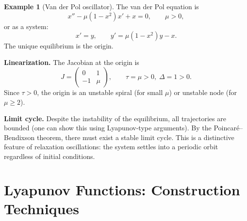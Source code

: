 \documentclass[12pt,a4paper,openany]{book}
\theoremstyle{definition}
\newtheorem{example}[definition]{Example}
\theoremstyle{plain}
\theoremstyle{remark}
\begin{document}
\begin{example}[Van der Pol oscillator]
\label{ex:van-der-pol}
The van der Pol equation is
\begin{equation}\label{eq:van-der-pol}
  x'' - \mu(1-x^2)x' + x = 0, \qquad \mu>0,
\end{equation}
or as a system:
\[
  x' = y, \qquad y' = \mu(1-x^2)y - x.
\]
The unique equilibrium is the origin.

\medskip\noindent\textbf{Linearization.}
The Jacobian at the origin is
\[
  J = \begin{pmatrix} 0 & 1 \\ -1 & \mu \end{pmatrix},
  \qquad \tau=\mu>0,\;\Delta=1>0.
\]
Since \(\tau>0\), the origin is an unstable spiral (for small \(\mu\)) or
unstable node (for \(\mu\ge 2\)).

\medskip\noindent\textbf{Limit cycle.}
Despite the instability of the equilibrium, all trajectories are bounded (one
can show this using Lyapunov-type arguments). By the Poincar\'e--Bendixson
theorem, there must exist a stable
limit cycle. This is a distinctive feature of relaxation
oscillations: the system settles into a periodic orbit regardless of initial
conditions.

\begin{center}
\end{center}
\end{example}


\section{Lyapunov Functions: Construction Techniques}
\label{sec:lyapunov-construction}
\end{document}
